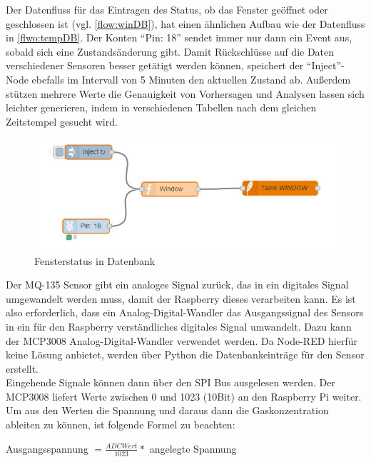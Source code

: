 Der Datenfluss für das Eintragen des Status, ob das Fenster geöffnet oder geschlossen ist (vgl. \autoref{flow:winDB}), hat einen ähnlichen Aufbau wie der Datenfluss in \autoref{flwo:tempDB}. Der Konten \enquote{Pin: 18} sendet immer nur dann ein Event aus, sobald sich eine Zustandsänderung gibt. Damit Rückschlüsse auf die Daten verschiedener Sensoren besser getätigt werden können, speichert der \enquote{Inject}-Node ebefalls im Intervall von 5 Minuten den aktuellen Zustand ab. 
Außerdem stützen mehrere Werte die Genauigkeit von Vorhersagen und Analysen lassen sich leichter generieren, indem in verschiedenen Tabellen nach dem gleichen Zeitstempel gesucht wird.
\begin{figure}[h]
	\centering
	\includegraphics[scale=0.7]{images/windowIntoDB}
	\caption{Fensterstatus in Datenbank}
	\label{flow:winDB}
\end{figure}

Der MQ-135 Sensor gibt ein analoges Signal zurück, das in ein digitales Signal umgewandelt werden muss, damit der Raspberry dieses verarbeiten kann. Es ist also erforderlich, dass ein Analog-Digital-Wandler das Ausgangssignal des Sensors in ein für den Raspberry verständliches digitales Signal umwandelt. Dazu kann der MCP3008 Analog-Digital-Wandler verwendet werden. Da Node-RED hierfür keine Lösung anbietet, werden über Python die Datenbankeinträge für den Sensor erstellt.
\\Eingehende Signale können dann über den \acf{SPI} Bus ausgelesen werden. Der MCP3008 liefert Werte zwischen 0 und 1023 (10Bit) an den Raspberry Pi weiter. Um aus den Werten die Spannung und daraus dann die Gaskonzentration ableiten zu können, ist folgende Formel zu beachten\cite{gas:MQX}:\\
\begin{center} Ausgangsspannung $=  \frac{ADC Wert}{1023} *  $ angelegte Spannung\end{center}

